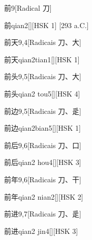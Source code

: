 \begin{entry}{前}{9}[Radical ⼑]
  \begin{phonetics}{前}{qian2}[][HSK 1]
    [293 a.C.]
  \end{phonetics}
\end{entry}

\begin{entry}{前天}{9,4}[Radicais ⼑、⼤]
  \begin{phonetics}{前天}{qian2tian1}[][HSK 1]
  \end{phonetics}
\end{entry}

\begin{entry}{前头}{9,5}[Radicais ⼑、⼤]
  \begin{phonetics}{前头}{qian2 tou5}[][HSK 4]
  \end{phonetics}
\end{entry}

\begin{entry}{前边}{9,5}[Radicais ⼑、⾡]
  \begin{phonetics}{前边}{qian2bian5}[][HSK 1]
  \end{phonetics}
\end{entry}

\begin{entry}{前后}{9,6}[Radicais ⼑、⼝]
  \begin{phonetics}{前后}{qian2 hou4}[][HSK 3]
  \end{phonetics}
\end{entry}

\begin{entry}{前年}{9,6}[Radicais ⼑、⼲]
  \begin{phonetics}{前年}{qian2 nian2}[][HSK 2]
  \end{phonetics}
\end{entry}

\begin{entry}{前进}{9,7}[Radicais ⼑、⾡]
  \begin{phonetics}{前进}{qian2 jin4}[][HSK 3]
  \end{phonetics}
\end{entry}

